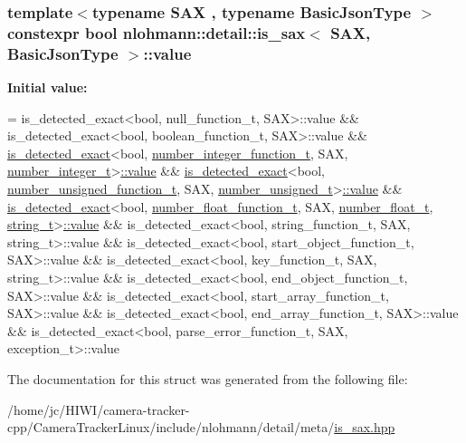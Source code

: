 \subsubsection[{\texorpdfstring{value}{value}}]{\setlength{\rightskip}{0pt plus 5cm}template$<$typename S\+AX , typename Basic\+Json\+Type $>$ constexpr bool {\bf nlohmann\+::detail\+::is\+\_\+sax}$<$ S\+AX, Basic\+Json\+Type $>$\+::value\hspace{0.3cm}{\ttfamily [static]}}\hypertarget{structnlohmann_1_1detail_1_1is__sax_a8ab7e51087000e948b4a2492257484dc}{}\label{structnlohmann_1_1detail_1_1is__sax_a8ab7e51087000e948b4a2492257484dc}
{\bfseries Initial value\+:}
\begin{DoxyCode}
=
        is\_detected\_exact<bool, null\_function\_t, SAX>::value &&
        is\_detected\_exact<bool, boolean\_function\_t, SAX>::value &&
        \hyperlink{namespacenlohmann_1_1detail_aa5a24092e12003ae73ae457b0dd29abd}{is\_detected\_exact}<bool, \hyperlink{namespacenlohmann_1_1detail_a4a3e14a011b9ea1ff849fc6d2411e6a0}{number\_integer\_function\_t}, SAX,
        \hyperlink{structnlohmann_1_1detail_1_1is__sax_aa9a29390ca9810cee149510f586f5573}{number\_integer\_t}>\hyperlink{structnlohmann_1_1detail_1_1is__sax_a8ab7e51087000e948b4a2492257484dc}{::value} &&
        \hyperlink{namespacenlohmann_1_1detail_aa5a24092e12003ae73ae457b0dd29abd}{is\_detected\_exact}<bool, \hyperlink{namespacenlohmann_1_1detail_a74da7b17bda76f65d276feb18209c913}{number\_unsigned\_function\_t}, SAX,
        \hyperlink{structnlohmann_1_1detail_1_1is__sax_a655c9b8038e51e5b9211e2419118644d}{number\_unsigned\_t}>\hyperlink{structnlohmann_1_1detail_1_1is__sax_a8ab7e51087000e948b4a2492257484dc}{::value} &&
        \hyperlink{namespacenlohmann_1_1detail_aa5a24092e12003ae73ae457b0dd29abd}{is\_detected\_exact}<bool, \hyperlink{namespacenlohmann_1_1detail_ad42df56e913abe26ed556e0e92f386f4}{number\_float\_function\_t}, SAX, 
      \hyperlink{structnlohmann_1_1detail_1_1is__sax_a58d3205c8d3c7a01cc330374fa7976c5}{number\_float\_t},
        \hyperlink{structnlohmann_1_1detail_1_1is__sax_ad8e2e1427ff43536370b6db6ab83ae50}{string\_t}>\hyperlink{structnlohmann_1_1detail_1_1is__sax_a8ab7e51087000e948b4a2492257484dc}{::value} &&
        is\_detected\_exact<bool, string\_function\_t, SAX, string\_t>::value &&
        is\_detected\_exact<bool, start\_object\_function\_t, SAX>::value &&
        is\_detected\_exact<bool, key\_function\_t, SAX, string\_t>::value &&
        is\_detected\_exact<bool, end\_object\_function\_t, SAX>::value &&
        is\_detected\_exact<bool, start\_array\_function\_t, SAX>::value &&
        is\_detected\_exact<bool, end\_array\_function\_t, SAX>::value &&
        is\_detected\_exact<bool, parse\_error\_function\_t, SAX, exception\_t>::value
\end{DoxyCode}


The documentation for this struct was generated from the following file\+:\begin{DoxyCompactItemize}
\item 
/home/jc/\+H\+I\+W\+I/camera-\/tracker-\/cpp/\+Camera\+Tracker\+Linux/include/nlohmann/detail/meta/\hyperlink{is__sax_8hpp}{is\+\_\+sax.\+hpp}\end{DoxyCompactItemize}
